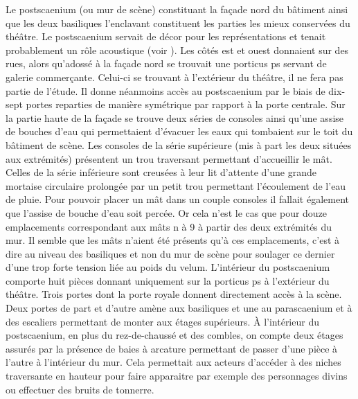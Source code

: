 		Le \gls{postscaenium} (ou mur de scène) constituant la façade nord du bâtiment ainsi que les deux \glspl{basilique} l'enclavant constituent les parties les mieux conservées du théâtre. Le \gls{postscaenium} servait de décor pour les représentations et tenait probablement un rôle acoustique (voir ). Les côtés est et ouest donnaient sur des rues, alors qu'adossé à la façade nord se trouvait une \gls{porticus ps} servant de galerie commerçante. Celui-ci se trouvant à l'extérieur du théâtre, il ne fera pas partie de l'étude. Il donne néanmoins accès au \gls{postscaenium} par le biais de dix-sept portes reparties de manière symétrique par rapport à la porte centrale. Sur la partie haute de la façade se trouve deux séries de \glspl{console} ainsi qu'une assise de bouches d'eau qui permettaient d'évacuer les eaux qui tombaient sur le toit du bâtiment de scène. Les \glspl{console} de la série supérieure (mis à part les deux situées aux extrémités) présentent un trou traversant permettant d'accueillir le mât. Celles de la série inférieure sont creusées à leur lit d'attente
d'une grande mortaise circulaire prolongée par un petit trou permettant l'écoulement de l'eau de pluie. Pour pouvoir placer un mât dans un couple \glspl{console} il fallait également que l'assise de bouche d'eau soit percée. Or cela n'est le cas que pour douze emplacements correspondant aux mâts n à 9 à partir des deux extrémités du mur. Il semble que les mâts n'aient été présents qu'à ces emplacements, c'est à dire au niveau des \glspl{basilique} et non du mur de scène pour soulager ce dernier d'une trop forte tension liée au poids du \gls{velum}. L'intérieur du \gls{postscaenium} comporte huit pièces donnant uniquement sur la \gls{porticus ps} à l'extérieur du théâtre. Trois portes dont la porte royale donnent directement accès à la scène. Deux portes de part et d'autre amène aux \glspl{basilique} et une au \gls{parascaenium} et à des escaliers permettant de monter aux étages supérieurs. \`{A} l'intérieur du \gls{postscaenium}, en plus du rez-de-chaussé et des combles, on compte deux étages assurés par la présence de baies à arcature permettant de passer d'une pièce à l'autre à l'intérieur du mur. Cela permettait aux acteurs d'accéder à des niches traversante en hauteur pour faire apparaitre par exemple des personnages divins ou effectuer des bruits de tonnerre. 
		
